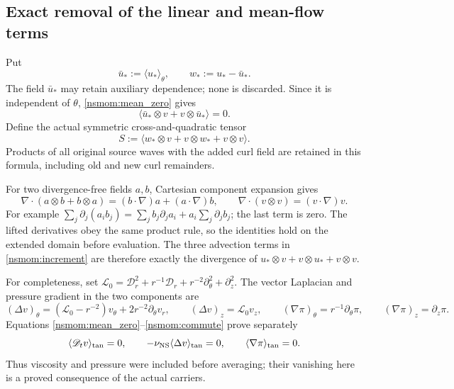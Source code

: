 \documentclass[11pt]{article}
\begin{document}
\subsection{Exact removal of the linear and mean-flow terms}
\label{nsmom:linear}
Put
\[
 \bar u_*:=\langle u_*\rangle_\theta,
 \qquad w_*:=u_*-\bar u_*.
\]
The field $\bar u_*$ may retain auxiliary dependence; none is discarded.
Since it is independent of $\theta$, \eqref{nsmom:mean_zero} gives
\[
 \langle\bar u_*\otimes v+v\otimes\bar u_*\rangle=0.
\]
Define the actual symmetric cross-and-quadratic tensor
\begin{equation}
 S:=\langle w_*\otimes v+v\otimes w_*+v\otimes v\rangle.
 \label{nsmom:stress}
\end{equation}
Products of all original source waves with the added curl field are
retained in this formula, including old and new curl remainders.

For two divergence-free fields $a,b$, Cartesian component expansion
gives
\[
 \nabla\cdot(a\otimes b+b\otimes a)
 =(b\cdot\nabla)a+(a\cdot\nabla)b,
 \qquad\nabla\cdot(v\otimes v)=(v\cdot\nabla)v.
\]
For example
$\sum_j\partial_j(a_i b_j)=\sum_jb_j\partial_ja_i+
a_i\sum_j\partial_jb_j$; the last term is zero. The lifted derivatives
obey the same product rule, so the identities hold on the extended
domain before evaluation. The three advection terms in
\eqref{nsmom:increment} are therefore exactly the divergence of
$u_*\otimes v+v\otimes u_*+v\otimes v$.

For completeness, set
$\mathscr L_0=\mathscr D_r^2+r^{-1}\mathscr D_r+
r^{-2}\partial_\theta^2+\partial_z^2$.
The vector Laplacian and pressure gradient in the two components are
\[
 (\Delta v)_\theta=(\mathscr L_0-r^{-2})v_\theta
                       +2r^{-2}\partial_\theta v_r,
 \qquad(\Delta v)_z=\mathscr L_0v_z,
 \qquad(\nabla\pi)_\theta=r^{-1}\partial_\theta\pi,
 \qquad(\nabla\pi)_z=\partial_z\pi.
\]
Equations \eqref{nsmom:mean_zero}--\eqref{nsmom:commute} prove separately
\begin{equation}
 \langle\mathscr D_t v\rangle_{\rm tan}=0,
 \qquad -\nu_{\rm NS}\langle\Delta v\rangle_{\rm tan}=0,
 \qquad\langle\nabla\pi\rangle_{\rm tan}=0.
 \label{nsmom:linear_zero}
\end{equation}
Thus viscosity and pressure were included before averaging; their
vanishing here is a proved consequence of the actual carriers.
\end{document}

